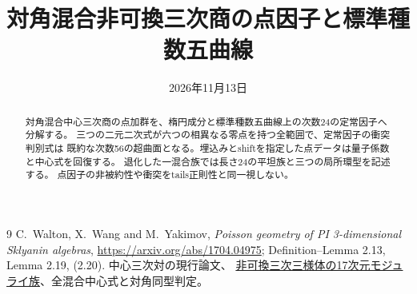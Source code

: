 \documentclass[11pt,a4paper]{ltjsarticle}
\title{対角混合非可換三次商の点因子と標準種数五曲線}
\date{2026年11月13日}
\begin{document}
\maketitle
\begin{abstract}
対角混合中心三次商の点加群を、楕円成分と標準種数五曲線上の次数24の定常因子へ分解する。
三つの二元二次式が六つの相異なる零点を持つ全範囲で、定常因子の衝突判別式は
既約な次数56の超曲面となる。埋込みとshiftを指定した点データは量子係数と中心式を回復する。
退化した一混合族では長さ24の平坦族と三つの局所環型を記述する。
点因子の非被約性や衝突をtails正則性と同一視しない。
\end{abstract}


\begin{thebibliography}{9}
 C.~Walton, X.~Wang and M.~Yakimov,
\emph{Poisson geometry of PI 3-dimensional Sklyanin algebras},
\url{https://arxiv.org/abs/1704.04975}; Definition--Lemma 2.13, Lemma 2.19, (2.20).
 中心三次対の現行論文、
\href{https://github.com/uedakazushi/nc-cubic-moduli/blob/main/papers/nc_cubic_threefold_moduli.tex}
{非可換三次三様体の17次元モジュライ族}、全混合中心式と対角同型判定。
\end{thebibliography}
\end{document}
